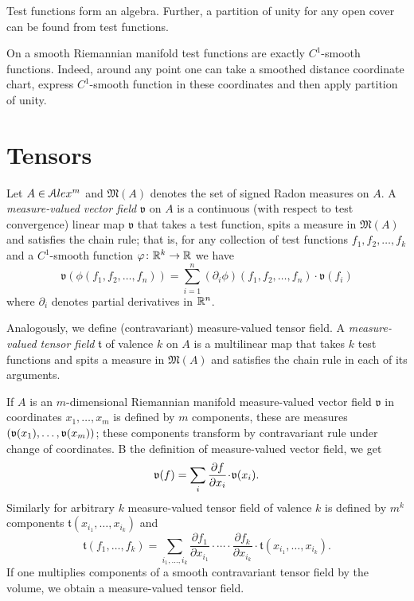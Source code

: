 Test functions form an algebra.
Further, a partition of unity for any open cover can be found from test functions.

On a smooth Riemannian manifold test functions
are exactly $C^1$-smooth functions.
Indeed, around any point one can take a
smoothed distance 
coordinate chart, express $C^1$-smooth function in these 
coordinates and then apply partition of unity. 
 
 
\section{Tensors}



Let $A\in \mathcal{A}lex^m$ and $\mathfrak M(A)$
denotes the set of signed Radon measures on $A$.
A \emph{measure-valued vector field} $\mathfrak{v}$  on $A$
is a  continuous (with respect to test convergence) linear map
$\mathfrak{v}$ that takes a test function, spits a measure in $\mathfrak M(A)$ and satisfies the
chain rule;
that is, for any collection of test functions $f_1,f_2,\dots,f_k$
and a $C^1$-smooth function $\varphi\colon\mathbb{R}^k\to\mathbb{R}$ we have
$$\mathfrak{v}(\phi(f_1,f_2,\dots,f_n))
=
\sum_{i=1}^n (\partial_i\phi)(f_1,f_2,\dots,f_n)\cdot\mathfrak{v}(f_i)$$
where $\partial_i$ denotes partial derivatives in $\mathbb{R}^n$.

Analogously, we define (contravariant) measure-valued tensor field.
A \emph{measure-valued tensor field} $\mathfrak{t}$ of valence $k$ on $A$ is a multilinear map that takes $k$ test functions and spits a measure in $\mathfrak M(A)$ and satisfies the chain rule in each of its arguments.


If $A$ is an $m$-dimensional Riemannian manifold measure-valued vector field $\mathfrak{v}$  in coordinates $x_1,\dots,x_m$
is defined by $m$ components, these are measures $(\mathfrak{v}(x_1),\dots,\mathfrak{v}(x_m))$;
these components transform by contravariant rule under change of coordinates.
B the definition of measure-valued vector field, we get
\[\mathfrak{v}(f)=\sum_{i}\frac{\partial f}{\partial x_i}\cdot \vv(x_i).\]
Similarly for arbitrary $k$ measure-valued tensor field of valence $k$ is defined by $m^k$ components 
$\mathfrak{t}(x_{i_1},\dots,x_{i_k})$
and
\[\mathfrak{t}(f_1,\dots,f_k)=\sum_{i_1,\dots,i_k}
\frac{\partial f_1}{\partial x_{i_1}}\cdot 
 \cdots \cdot\frac{\partial f_k}{\partial x_{i_k}}
\cdot \mathfrak{t}(x_{i_1},\dots,x_{i_k}).\]
If one multiplies components of a smooth contravariant tensor field by the volume, we obtain a measure-valued tensor field.

